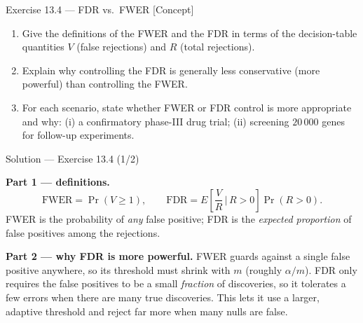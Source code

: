 \documentclass[aspectratio=169,11pt]{beamer}
\begin{document}
\begin{frame}{Exercise 13.4 --- FDR vs.\ FWER [Concept]}
\begin{exercise}
  \begin{enumerate}
    \item Give the definitions of the FWER and the FDR in terms of the
          decision-table quantities $V$ (false rejections) and $R$
          (total rejections).
    \item Explain why controlling the FDR is generally less
          conservative (more powerful) than controlling the FWER.
    \item For each scenario, state whether FWER or FDR control is more
          appropriate and why: (i) a confirmatory phase-III drug
          trial; (ii) screening $20\,000$ genes for follow-up
          experiments.
  \end{enumerate}
\end{exercise}
\end{frame}

\begin{frame}{Solution --- Exercise 13.4 (1/2)}
\begin{solutionbox}
  \textbf{Part 1 --- definitions.}
  \[
    \text{FWER} = \Pr(V \ge 1),
    \qquad
    \text{FDR} = E\!\left[\frac{V}{R} \,\Big|\, R > 0\right]\Pr(R > 0).
  \]
  FWER is the probability of \emph{any} false positive; FDR is the
  \emph{expected proportion} of false positives among the rejections.

  \medskip
  \textbf{Part 2 --- why FDR is more powerful.} FWER guards against a
  single false positive anywhere, so its threshold must shrink with
  $m$ (roughly $\alpha/m$). FDR only requires the false positives to
  be a small \emph{fraction} of discoveries, so it tolerates a few
  errors when there are many true discoveries. This lets it use a
  larger, adaptive threshold and reject far more when many nulls are
  false.
\end{solutionbox}
\end{frame}
\end{document}
